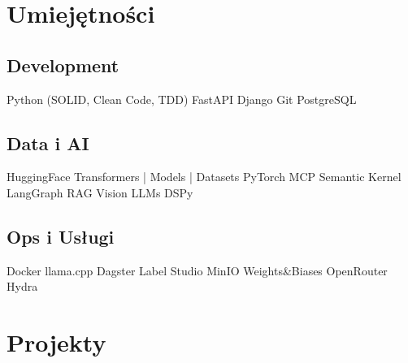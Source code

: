 \documentclass[]{deedy-resume-openfont}
\begin{document}
\begin{minipage}[t]{0.4\textwidth}

\section{Umiejętności}
\subsection{Development}
Python (SOLID, Clean Code, TDD) \textbullet{} FastAPI \textbullet{} Django \textbullet{} Git \textbullet{} PostgreSQL
\sectionsep

\subsection{Data i AI}
HuggingFace Transformers | Models | Datasets \textbullet{} PyTorch \textbullet{} MCP \textbullet{} Semantic Kernel \textbullet{} LangGraph \textbullet{} RAG \textbullet{}  Vision LLMs \textbullet{} DSPy
\sectionsep

\subsection{Ops i Usługi}
Docker \textbullet{} llama.cpp \textbullet{} Dagster \textbullet{} Label Studio \textbullet{} MinIO \textbullet{} Weights\&Biases \textbullet{} OpenRouter \textbullet{} Hydra


\section{Projekty}

\sectionsep
{}


%

\end{minipage} 
\hfill
\end{document}
